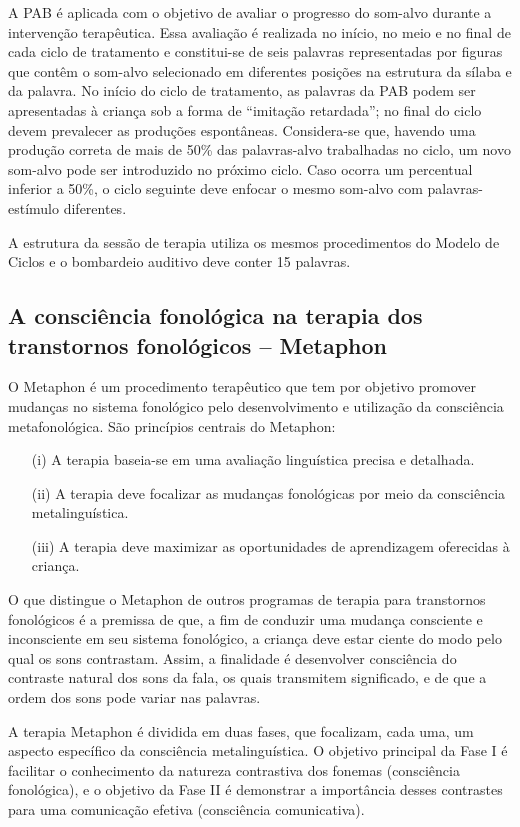 \documentclass[output=paper,colorlinks,citecolor=brown,booklanguage=portuguese]{langscibook}
\begin{document}
A PAB é aplicada com o objetivo de avaliar o progresso do som-alvo durante a intervenção terapêutica. Essa avaliação é realizada no início, no meio e no final de cada ciclo de tratamento e constitui-se de seis palavras representadas por figuras que contêm o som-alvo selecionado em diferentes posições na estrutura da sílaba e da palavra. No início do ciclo de tratamento, as palavras da PAB podem ser apresentadas à criança sob a forma de “imitação retardada”; no final do ciclo devem prevalecer as produções espontâneas. Considera-se que, havendo uma produção correta de mais de 50\% das palavras-alvo trabalhadas no ciclo, um novo som-al\-vo pode ser introduzido no próximo ciclo. Caso ocorra um percentual inferior a 50\%, o ciclo seguinte deve enfocar o mesmo som-alvo com palavras-estímulo diferentes.

A estrutura da sessão de terapia utiliza os mesmos procedimentos do Modelo de Ciclos e o bombardeio auditivo deve conter 15 palavras.

\subsection{A consciência fonológica na terapia dos transtornos fonológicos -- Metaphon}\label{sec:cap5sec2quatro}
O Metaphon \citep{Dean1986} é um procedimento terapêutico que tem por objetivo promover mudanças no sistema fonológico pelo desenvolvimento e utilização da consciência metafonológica. São princípios centrais do Metaphon:

\begin{itemize}
\item [(i)] A terapia baseia-se em uma avaliação linguística precisa e detalhada.
\item [(ii)] A terapia deve focalizar as mudanças fonológicas por meio da consciência metalinguística.
\item [(iii)] A terapia deve maximizar as oportunidades de aprendizagem oferecidas à criança.
\end{itemize}

O que distingue o Metaphon de outros programas de terapia para transtornos fonológicos é a premissa de que, a fim de conduzir uma mudança consciente e inconsciente em seu sistema fonológico, a criança deve estar ciente do modo pelo qual os sons contrastam. Assim, a finalidade é desenvolver consciência do contraste natural dos sons da fala, os quais transmitem significado, e de que a ordem dos sons pode variar nas palavras.

A terapia Metaphon é dividida em duas fases, que focalizam, cada uma, um aspecto específico da consciência metalinguística. O objetivo principal da Fase I é facilitar o conhecimento da natureza contrastiva dos fonemas (consciência fonológica), e o objetivo da Fase II é demonstrar a importância desses contrastes para uma comunicação efetiva (consciência comunicativa).
\end{document}
